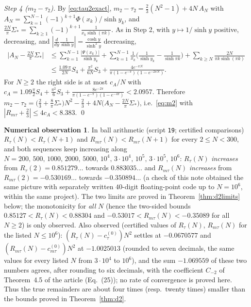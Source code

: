 \documentclass[11pt,a4paper]{article}
\theoremstyle{plain}
\theoremstyle{definition}
\newtheorem{observation}[theorem]{Numerical observation}
\numberwithin{equation}{section}
\begin{document}
\emph{Step 4 ($m_2-\tau_2$).} By \eqref{eq:tau2exact}, $m_2-\tau_2=\frac23(N^2-1)+4N\,A_N$ with $A_N=\sum_{k=1}^{N-1}(-1)^{k+1}\Phi(x_k)/\sinh y_k$, and $\frac{2N}{\pi}\Sigma_*=\sum_{k\ge1}(-1)^{k+1}\frac{1}{x_k\sinh(\pi k)}$. As in Step 2, with $y\mapsto1/\sinh y$ positive, decreasing, and $|\frac{d}{dy}\frac1{\sinh y}|=\frac{\cosh y}{\sinh^2y}$ decreasing,
\[
\begin{aligned}\Big|A_N-\frac{2N}\pi\Sigma_*\Big|&\le\sum_{k=1}^{N-1}\frac{|\Psi(x_k)|}{\sinh y_k}+\sum_{k=1}^{N-1}\frac1{x_k}\Big(\frac{1}{\sinh y_k}-\frac1{\sinh\pi k}\Big)+\sum_{k\ge N}\frac{2N}{\pi k\sinh(\pi k)}\\
&\le\frac{1.09\,\pi}{2N}S_4+\frac{\pi^2}{6N}S_3+\frac{4e^{-\pi N}}{\pi(1-e^{-\pi})(1-e^{-2\pi N})} .\end{aligned}
\]
For $N\ge2$ the right side is at most $c_A/N$ with $c_A=1.09\frac\pi2S_4+\frac{\pi^2}6S_3+\frac{8e^{-2\pi}}{\pi(1-e^{-\pi})(1-e^{-4\pi})}<2.0957$. Therefore
$m_2-\tau_2=\big(\frac23+\frac8\pi\Sigma_*\big)N^2-\frac23+4N\big(A_N-\frac{2N}\pi\Sigma_*\big)$, i.e.\ \eqref{eq:m2} with $|R_{m\tau}+\frac23|\le4c_A<8.383$. \qed

\begin{observation}\label{obs:d2}
In ball arithmetic (script \texttt{19}; certified comparisons) $R_\tau(N)<R_\tau(N+1)$ and $R_{m\tau}(N)<R_{m\tau}(N+1)$ for every $2\le N<300$, and both sequences keep increasing along $N=200,\,500,\,1000,\,2000,\,5000,\,10^4,\,3\cdot10^4,\,10^5,\,3\cdot10^5,\,10^6$: $R_\tau(N)$ \emph{increases} from $R_\tau(2)=0.851279\ldots$ towards $0.883035\ldots$ and $R_{m\tau}(N)$ \emph{increases} from $R_{m\tau}(2)=-0.530169\ldots$ towards $-0.350894\ldots$ (a check of this note obtained the same picture with separately written $40$-digit floating-point code up to $N=10^6$, within the same project). The two limits are proved in Theorem~\ref{thm:d2limits} below; the monotonicity for \emph{all} $N$ (hence the two-sided bounds $0.85127<R_\tau(N)<0.88304$ and $-0.53017<R_{m\tau}(N)<-0.35089$ for all $N\ge2$) is only observed. Also observed (certified values of $R_\tau(N)$, $R_{m\tau}(N)$ for the listed $N\le10^6$): $(R_\tau(N)-c^{(0)}_\tau)N^2$ settles at $-0.0670577$ and $(R_{m\tau}(N)-c^{(0)}_{m\tau})N^2$ at $-1.0025013$ (rounded to seven decimals, the same values for every listed $N$ from $3\cdot10^4$ to $10^6$), and the sum $-1.069559$ of these two numbers agrees, after rounding to six decimals, with the coefficient $C_{-2}$ of Theorem~4.5 of the article (Eq.~(25)); no rate of convergence is proved here. Thus the true remainders are about four times (resp.\ twenty times) smaller than the bounds proved in Theorem~\ref{thm:d2}.
\end{observation}
\end{document}
